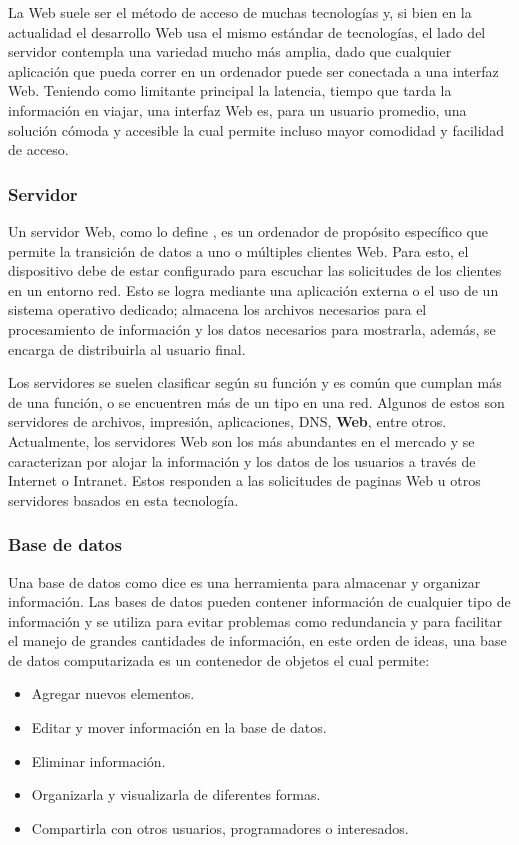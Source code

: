 La Web suele ser el método de acceso de muchas tecnologías y, si bien en la actualidad
el desarrollo Web usa el mismo estándar de tecnologías, el lado del servidor
contempla una variedad mucho más amplia, dado que cualquier aplicación que
pueda correr en un ordenador puede ser conectada a una interfaz Web. Teniendo
como limitante principal la latencia,  tiempo que tarda la información en viajar,
una interfaz Web es, para un usuario promedio, una solución cómoda y
accesible la cual  permite incluso  mayor comodidad y facilidad de acceso.


\subsubsection*{Servidor}

Un servidor Web, como lo define \Cite{servidor},  es un ordenador de propósito
específico que permite la
transición de datos a uno o múltiples clientes Web. Para esto, el dispositivo
debe de estar configurado para escuchar las solicitudes de los clientes en un
entorno red. Esto se logra mediante una aplicación externa o el uso de un
sistema operativo dedicado; almacena los archivos
necesarios para el procesamiento de información y los datos necesarios para
mostrarla, además, se encarga de distribuirla al usuario final.

Los servidores se suelen clasificar según su función y es común que cumplan más
de una función, o se encuentren más de un tipo en una red. Algunos de estos son
servidores de archivos, impresión, aplicaciones, DNS, \textbf{Web}, entre otros.
Actualmente, los servidores Web son los más abundantes en el mercado
y se caracterizan por alojar la información y los datos de los usuarios a través
de Internet o Intranet. Estos responden a las solicitudes de paginas Web u otros
servidores basados en esta tecnología.

\subsubsection{Base de datos}
Una base de datos como dice \cite{bbdd} es una herramienta para almacenar y
organizar información.
Las bases de datos pueden contener información de cualquier tipo de información
y se utiliza para evitar problemas como redundancia y para facilitar el manejo de
grandes cantidades de información, en este orden de ideas,  una base de datos
computarizada es un contenedor de objetos el cual permite:

\begin{itemize}
    \item Agregar nuevos elementos.
    \item Editar y mover información en la base de datos.
    \item Eliminar información.
    \item Organizarla y visualizarla de diferentes formas.
    \item Compartirla con otros usuarios, programadores o interesados.
\end{itemize}

